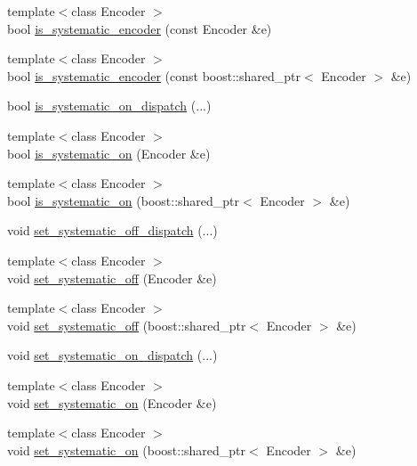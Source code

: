 \begin{DoxyCompactItemize}
\item 
{\footnotesize template$<$class Encoder $>$ }\\bool \hyperlink{namespacekodo_a28819f1383e522581e8dc7fb351b0438}{is\-\_\-systematic\-\_\-encoder} (const Encoder \&e)
\item 
{\footnotesize template$<$class Encoder $>$ }\\bool \hyperlink{namespacekodo_a0eed748c3372ff18d65a7d6bf7d5fb66}{is\-\_\-systematic\-\_\-encoder} (const boost\-::shared\-\_\-ptr$<$ Encoder $>$ \&e)
\item 
bool \hyperlink{namespacekodo_ac0a13c9a6557f84250910206ee04905a}{is\-\_\-systematic\-\_\-on\-\_\-dispatch} (...)
\item 
{\footnotesize template$<$class Encoder $>$ }\\bool \hyperlink{namespacekodo_a5ddd9632e1c9a2387bf15c81ad6c793b}{is\-\_\-systematic\-\_\-on} (Encoder \&e)
\item 
{\footnotesize template$<$class Encoder $>$ }\\bool \hyperlink{namespacekodo_a7cfc3e2516396e709f08e795aedd0316}{is\-\_\-systematic\-\_\-on} (boost\-::shared\-\_\-ptr$<$ Encoder $>$ \&e)
\item 
void \hyperlink{namespacekodo_a4da653f13bbc24f1513fdb70ce4adab5}{set\-\_\-systematic\-\_\-off\-\_\-dispatch} (...)
\item 
{\footnotesize template$<$class Encoder $>$ }\\void \hyperlink{namespacekodo_a759a26580c7da7172657f338fd72a934}{set\-\_\-systematic\-\_\-off} (Encoder \&e)
\item 
{\footnotesize template$<$class Encoder $>$ }\\void \hyperlink{namespacekodo_a17fff80cddd66155cfa15d8b8ce8415b}{set\-\_\-systematic\-\_\-off} (boost\-::shared\-\_\-ptr$<$ Encoder $>$ \&e)
\item 
void \hyperlink{namespacekodo_ab49f22550578e1311b976e3b39fcd1e4}{set\-\_\-systematic\-\_\-on\-\_\-dispatch} (...)
\item 
{\footnotesize template$<$class Encoder $>$ }\\void \hyperlink{namespacekodo_a949e0264c6b1b7ec1d4d71fe60160c32}{set\-\_\-systematic\-\_\-on} (Encoder \&e)
\item 
{\footnotesize template$<$class Encoder $>$ }\\void \hyperlink{namespacekodo_ae472b70a5a866749d5ce8d4156720cfb}{set\-\_\-systematic\-\_\-on} (boost\-::shared\-\_\-ptr$<$ Encoder $>$ \&e)
\end{DoxyCompactItemize}


